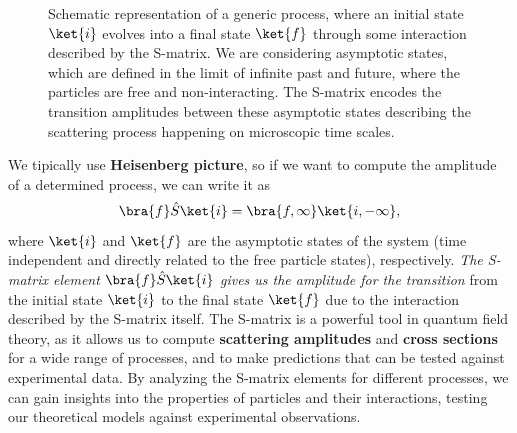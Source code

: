 \begin{figure}[H]
    \centering
    \caption{Schematic representation of a generic process, where an initial state \(\ket{i}\) evolves into a final state \(\ket{f}\) through some interaction described by the S-matrix. We are considering asymptotic states, which are defined in the limit of infinite past and future, where the particles are free and non-interacting. The S-matrix encodes the transition amplitudes between these asymptotic states describing the scattering process happening on microscopic time scales.}
\end{figure}

We tipically use \textbf{Heisenberg picture}, so if we want to compute the amplitude of a determined process, we can write it as
\[
    \bra{f} \hat{S} \ket{i} = \bra{f, \infty} \ket{i, -\infty},
\]
where $\ket{i}$ and $\ket{f}$ are the asymptotic states of the system (time independent and directly related to the free particle states), respectively. \textit{The S-matrix element} $\bra{f} \hat{S} \ket{i}$ \textit{gives us the amplitude for the transition} from the initial state $\ket{i}$ to the final state $\ket{f}$ due to the interaction described by the S-matrix itself. The S-matrix is a powerful tool in quantum field theory, as it allows us to compute \textbf{scattering amplitudes} and \textbf{cross sections} for a wide range of processes, and to make predictions that can be tested against experimental data. By analyzing the S-matrix elements for different processes, we can gain insights into the properties of particles and their interactions, testing our theoretical models against experimental observations.

